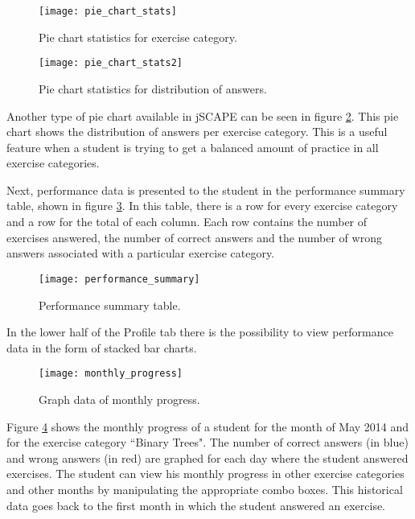 \begin{figure}[H]
\centering
\texttt{[image: pie\_chart\_stats]}
\caption{Pie chart statistics for exercise category.}
\label{fig:pie_chart_stats1}
\end{figure}

\begin{figure}[H]
\centering
\texttt{[image: pie\_chart\_stats2]}
\caption{Pie chart statistics for distribution of answers.}
\label{fig:pie_chart_stats2}
\end{figure}

Another type of pie chart available in jSCAPE can be seen in figure \ref{fig:pie_chart_stats2}. This pie chart shows the distribution of answers per exercise category. This is a useful feature when a student is trying to get a balanced amount of practice in all exercise categories. \newline

Next, performance data is presented to the student in the performance summary table, shown in figure \ref{fig:performance_summary}. In this table, there is a row for every exercise category and a row for the total of each column. Each row contains the number of exercises answered, the number of correct answers and the number of wrong answers associated with a particular exercise category.

\begin{figure}[H]
\centering
\texttt{[image: performance\_summary]}
\caption{Performance summary table.}
\label{fig:performance_summary}
\end{figure}

In the lower half of the Profile tab there is the possibility to view performance data in the form of stacked bar charts.

\begin{figure}[H]
\centering
\texttt{[image: monthly\_progress]}
\caption{Graph data of monthly progress.}
\label{fig:monthly_progress}
\end{figure}

Figure \ref{fig:monthly_progress} shows the monthly progress of a student for the month of May 2014 and for the exercise category ``Binary Trees". The number of correct answers (in blue) and wrong answers (in red) are graphed for each day where the student answered exercises. The student can view his monthly progress in other exercise categories and other months by manipulating the appropriate combo boxes. This historical data goes back to the first month in which the student answered an exercise.

